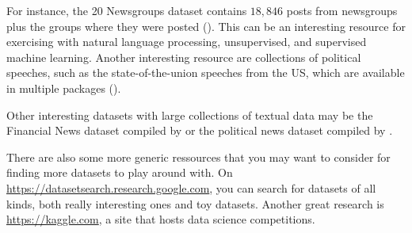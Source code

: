 For instance, the 20 Newsgroups dataset contains $18,846$ posts from
newsgroups plus the groups where they were posted
(). This can be an interesting resource for
exercising with natural language processing, unsupervised, and
supervised machine learning. Another interesting resource are
collections of political speeches, such as the state-of-the-union
speeches from the US, which are available in multiple packages
().




Other interesting datasets with large collections of textual data may
be the Financial News dataset compiled by \cite{Chen2017} or the
political news dataset compiled by \cite{Horne2018}.

There are also some more generic ressources that you may want to consider for finding
more datasets to play around with. On  \url{https://datasetsearch.research.google.com},
you can search for datasets of all kinds, both really interesting ones and toy datasets.
Another great research is \url{https://kaggle.com}, a site that hosts data
science competitions.




